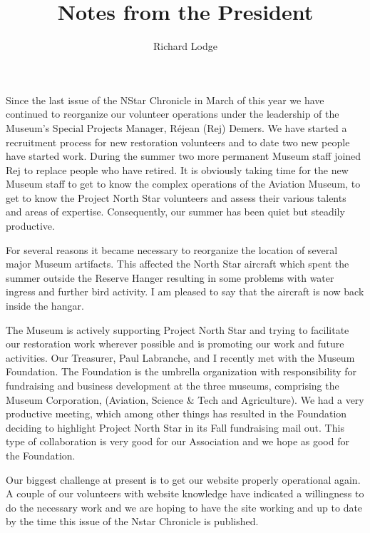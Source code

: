 
%


\title{Notes from the President}
\author{Richard Lodge}

\maketitle

Since the last issue of the NStar Chronicle in March of this year we
have continued to reorganize our volunteer operations under the
leadership of the Museum's Special Projects Manager, R\'{e}jean (Rej)
Demers. We have started a recruitment process for new restoration
volunteers and to date two new people have started work. During the
summer two more permanent Museum staff joined Rej to replace people who
have retired. It is obviously taking time for the new Museum staff to
get to know the complex operations of the Aviation Museum, to get to
know the Project North Star volunteers and assess their various talents
and areas of expertise. Consequently, our summer has been quiet but
steadily productive.

For several reasons it became necessary to reorganize the location of
several major Museum artifacts. This affected the North Star aircraft
which spent the summer outside the Reserve Hanger resulting in some
problems with water ingress and further bird activity. I am pleased to
say that the aircraft is now back inside the hangar.

The Museum is actively supporting Project North Star and trying to
facilitate our restoration work wherever possible and is promoting our
work and future activities. Our Treasurer, Paul Labranche, and I
recently met with the Museum Foundation. The Foundation is the umbrella
organization with responsibility for fundraising and business
development at the three museums, comprising the Museum Corporation,
(Aviation, Science \& Tech and Agriculture). We had a very productive
meeting, which among other things has resulted in the Foundation
deciding to highlight Project North Star in its Fall fundraising mail
out. This type of collaboration is very good for our Association and we
hope as good for the Foundation.

Our biggest challenge at present is to get our website properly
operational again. A couple of our volunteers with website knowledge
have indicated a willingness to do the necessary work and we are hoping
to have the site working and up to date by the time this issue of the
Nstar Chronicle is published.

